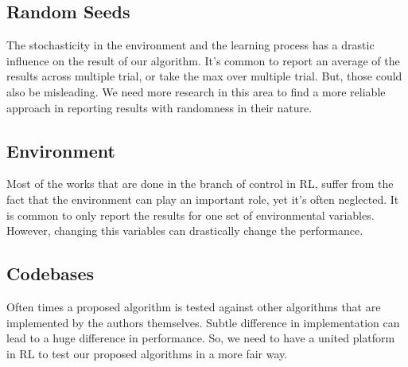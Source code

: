 \documentclass{article}
\theoremstyle{remark}
\theoremstyle{remark}
\theoremstyle{remark}
\theoremstyle{remark}
\theoremstyle{remark}
\theoremstyle{remark}
\begin{document}
\subsection{Random Seeds}
The stochasticity in the environment and the learning process has a drastic influence on the result of our algorithm. It's common to report an average of the results across multiple trial, or take the max over multiple trial. But, those could also be misleading. We need more research in this area to find a more reliable approach in reporting results with randomness in their nature.

\subsection{Environment}
Most of the works that are done in the branch of control in RL, suffer from the fact that the environment can play an important role, yet it's often neglected. It is common to only report the results for one set of environmental variables. However, changing this variables can drastically change the performance.

\subsection{Codebases}
Often times a proposed algorithm is tested against other algorithms that are implemented by the authors themselves. Subtle difference in implementation can lead to a huge difference in performance. So, we need to have a united platform in RL to test our proposed algorithms in a more fair way.
\end{document}
